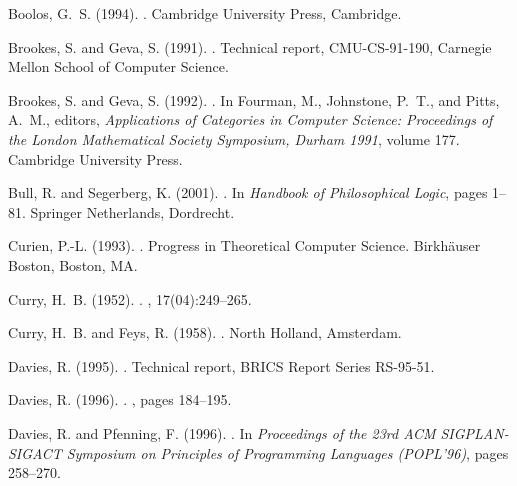 \documentclass[a4paper]{amsart}
\begin{document}
\begin{thebibliography}{}
Boolos, G.~S. (1994).
.
\newblock Cambridge University Press, Cambridge.

Brookes, S. and Geva, S. (1991).
.
\newblock Technical report, CMU-CS-91-190, Carnegie Mellon School of Computer
  Science.

Brookes, S. and Geva, S. (1992).
.
\newblock In Fourman, M., Johnstone, P.~T., and Pitts, A.~M., editors, {\em
  Applications of Categories in Computer Science: Proceedings of the London
  Mathematical Society Symposium, Durham 1991}, volume 177. Cambridge
  University Press.

Bull, R. and Segerberg, K. (2001).
.
\newblock In {\em Handbook of Philosophical Logic}, pages 1--81. Springer
  Netherlands, Dordrecht.

Curien, P.-L. (1993).
.
\newblock Progress in Theoretical Computer Science. Birkh{\"{a}}user Boston,
  Boston, MA.

Curry, H.~B. (1952).
.
, 17(04):249--265.

Curry, H.~B. and Feys, R. (1958).
.
\newblock North Holland, Amsterdam.

Davies, R. (1995).
.
\newblock Technical report, BRICS Report Series RS-95-51.

Davies, R. (1996).
.
, pages 184--195.

Davies, R. and Pfenning, F. (1996).
.
\newblock In {\em Proceedings of the 23rd ACM SIGPLAN-SIGACT Symposium on
  Principles of Programming Languages (POPL'96)}, pages 258--270.


\end{thebibliography}
\end{document}
